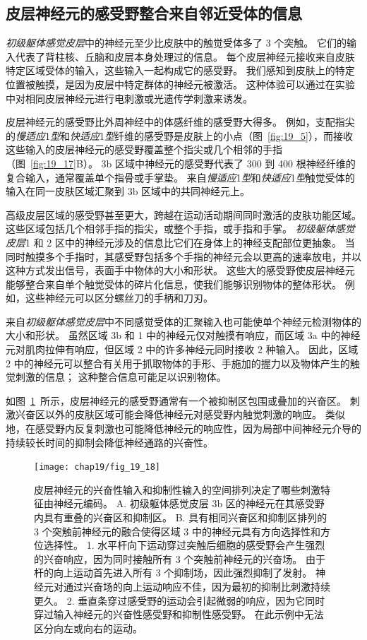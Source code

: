 \subsection{皮层神经元的感受野整合来自邻近受体的信息}


\textit{初级躯体感觉皮层}中的神经元至少比皮肤中的触觉受体多了 3 个突触。
它们的输入代表了背柱核、丘脑和皮层本身处理过的信息。 
每个皮层神经元接收来自皮肤特定区域受体的输入，这些输入一起构成它的感受野。
我们感知到皮肤上的特定位置被触摸，是因为皮层中特定群体的神经元被激活。
这种体验可以通过在实验中对相同皮层神经元进行电刺激或光遗传学刺激来诱发。


皮层神经元的感受野比外周神经中的体感纤维的感受野大得多。
例如，支配指尖的\textit{慢适应}1\textit{型}和\textit{快适应}1\textit{型}纤维的感受野是皮肤上的小点（图~\ref{fig:19_5}），而接收这些输入的皮层神经元的感受野覆盖整个指尖或几个相邻的手指（图~\ref{fig:19_17}B）。
3b 区域中神经元的感受野代表了 300 到 400 根神经纤维的复合输入，通常覆盖单个指骨或手掌垫。
来自\textit{慢适应}1\textit{型}和\textit{快适应}1\textit{型}触觉受体的输入在同一皮肤区域汇聚到 3b 区域中的共同神经元上。


高级皮层区域的感受野甚至更大，跨越在运动活动期间同时激活的皮肤功能区域。
这些区域包括几个相邻手指的指尖，或整个手指，或手指和手掌。
\textit{初级躯体感觉皮层}1 和 2 区中的神经元涉及的信息比它们在身体上的神经支配部位更抽象。
当同时触摸多个手指时，其感受野包括多个手指的神经元会以更高的速率放电，并以这种方式发出信号，表面手中物体的大小和形状。
这些大的感受野使皮层神经元能够整合来自单个触觉受体的碎片化信息，使我们能够识别物体的整体形状。
例如，这些神经元可以区分螺丝刀的手柄和刀刃。


来自\textit{初级躯体感觉皮层}中不同感觉受体的汇聚输入也可能使单个神经元检测物体的大小和形状。
虽然区域 3b 和 1 中的神经元仅对触摸有响应，而区域 3a 中的神经元对肌肉拉伸有响应，但区域 2 中的许多神经元同时接收 2 种输入。
因此，区域 2 中的神经元可以整合有关用于抓取物体的手形、手施加的握力以及物体产生的触觉刺激的信息；
这种整合信息可能足以识别物体。


如图~\ref{fig:19_18}~所示，皮层神经元的感受野通常有一个被抑制区包围或叠加的兴奋区。
刺激兴奋区以外的皮肤区域可能会降低神经元对感受野内触觉刺激的响应。
类似地，在感受野内反复刺激也可能降低神经元的响应性，因为局部中间神经元介导的持续较长时间的抑制会降低神经通路的兴奋性。


\begin{figure}[htbp]
	\centering
	\texttt{[image: chap19/fig\_19\_18]}
	\caption{皮层神经元的兴奋性输入和抑制性输入的空间排列决定了哪些刺激特征由神经元编码。
		A. 初级躯体感觉皮层 3b 区的神经元在其感受野内具有重叠的兴奋区和抑制区\cite{dicarlo1998structure,sripati2006spatiotemporal}。
		B. 具有相同兴奋区和抑制区排列的 3 个突触前神经元的融合使得区域 3 中的神经元具有方向选择性和方位选择性。
		1. 水平杆向下运动穿过突触后细胞的感受野会产生强烈的兴奋响应，因为同时接触所有 3 个突触前神经元的兴奋场。
		由于杆的向上运动首先进入所有 3 个抑制场，因此强烈抑制了发射。
		神经元对通过兴奋场的向上运动响应不佳，因为最初的抑制比刺激持续更久。
		2. 垂直条穿过感受野的运动会引起微弱的响应，因为它同时穿过输入神经元的兴奋性感受野和抑制性感受野。
		在此示例中无法区分向左或向右的运动。}
	\label{fig:19_18}
\end{figure}


